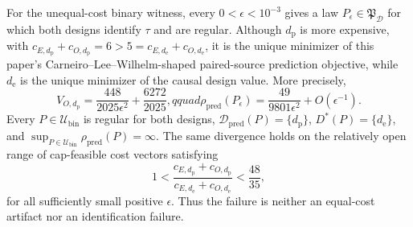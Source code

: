 For the unequal-cost binary witness, every \(0<\epsilon<10^{-3}\) gives a law \(P_\epsilon\in\mathfrak P_{\mathcal D}\) for which both designs identify \(\tau\) and are regular.  Although \(d_{\mathrm p}\) is more expensive, with \(c_{E,d_{\mathrm p}}+c_{O,d_{\mathrm p}}=6>5=c_{E,d_{\mathrm e}}+c_{O,d_{\mathrm e}}\), it is the unique minimizer of this paper's Carneiro--Lee--Wilhelm-shaped paired-source prediction objective, while \(d_{\mathrm e}\) is the unique minimizer of the causal design value.  More precisely,
\[
 V_{O,d_{\mathrm p}}=\frac{448}{2025\epsilon^2}+\frac{6272}{2025},qquad
 \rho_{\mathrm{pred}}(P_\epsilon)=\frac{49}{9801\epsilon^2}+O(\epsilon^{-1}).
\]
Every \(P\in\mathcal U_{\mathrm{bin}}\) is regular for both designs, \(\mathcal D_{\mathrm{pred}}(P)=\{d_{\mathrm p}\}\), \(D^*(P)=\{d_{\mathrm e}\}\), and \(\sup_{P\in\mathcal U_{\mathrm{bin}}}\rho_{\mathrm{pred}}(P)=\infty\).  The same divergence holds on the relatively open range of cap-feasible cost vectors satisfying
\[
 1<\frac{c_{E,d_{\mathrm p}}+c_{O,d_{\mathrm p}}}
 {c_{E,d_{\mathrm e}}+c_{O,d_{\mathrm e}}}<\frac{48}{35},
\]
for all sufficiently small positive \(\epsilon\).  Thus the failure is neither an equal-cost artifact nor an identification failure.